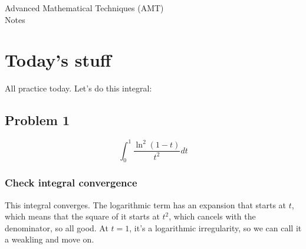 \documentclass{article}
\begin{document}
\thispagestyle{fancy}
\begin{center}\LARGE{Advanced Mathematical Techniques (AMT) \\ Notes}\end{center}
\section{Today's stuff}
All practice today. Let's do this integral:
\subsection{Problem 1}
\[\int_{0}^{1} \frac{\ln^2(1-t)}{t^2}dt\]
\subsubsection{Check integral convergence}
This integral converges. The logarithmic term has an expansion that starts at $t$, which means that the square of it starts at $t^2$, which cancels with the denominator, so all good. At $t=1$, it's a logarithmic irregularity, so we can call it a weakling and move on.
\end{document}
